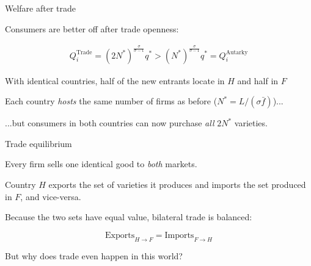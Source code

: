 \documentclass[notes,11pt, aspectratio=169, xcolor=table]{beamer}
\newenvironment{wideitemize}{\itemize\addtolength{\itemsep}{10pt}}{\enditemize}
\begin{document}
\begin{frame}{Welfare after trade}
\begin{wideitemize}
    \item Consumers are better off after trade openness:

\begin{eqnarray*}
         Q_i^{\text{Trade}} = (2 N^*)^{\frac{\sigma}{\sigma-1}} q^* > (N^*)^{\frac{\sigma}{\sigma-1}} q^* =Q_i^{\text{Autarky}}
\end{eqnarray*}

\item With identical countries, half of the new entrants locate in $H$ and half in $F$

\item Each country \emph{hosts} the same number of firms as before ($N^{*}=L/(\sigma\bar f)$)...

\item ...but consumers in both countries can now purchase \emph{all} $2N^*$ varieties.

\end{wideitemize}
\end{frame}

\begin{frame}{Trade equilibrium}

\begin{wideitemize}
    \item Every firm sells one identical good to \emph{both} markets.
    
    \item<2-> Country $H$ exports the set of varieties it produces and imports the set produced in $F$, and vice-versa.
    
    \item<3-> Because the two sets have equal value, bilateral trade is balanced:

    \begin{equation*}
        \text{Exports}_{H\to F} = \text{Imports}_{F\to H}
    \end{equation*}

    \item<4-> But why does trade even happen in this world?
    
\end{wideitemize}
    
\end{frame}
\end{document}
